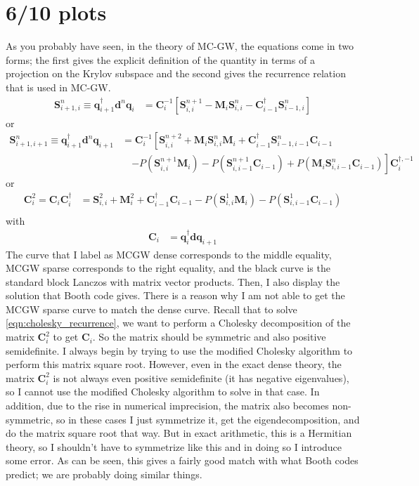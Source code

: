 \section{6/10 plots}
As you probably have seen, in the theory of MC-GW, the equations come in two forms; the first gives the explicit definition of the quantity in terms of a projection on the Krylov subspace and the second gives the recurrence relation that is used in MC-GW.
\begin{align}
    \bm{S}_{i+1,i}^{n}\equiv\bm{q}_{i+1}^{\dag}\bm{d}^n\bm{q}_{i}
    &= {\bm{C}_i^{-1}\left[\bm{S}_{i,i}^{n+1} - \bm{M}_i\bm{S}_{i,i}^n - \bm{C}_{i-1}^{\dag}\bm{S}_{i-1,i}^n\right]}
\end{align}
or
\begin{align}
    \bm{S}_{i+1,i+1}^{n}\equiv\bm{q}_{i+1}^{\dag}\bm{d}^n\bm{q}_{i+1} &= \bm{C}_i^{-1}\left[\bm{S}_{i,i}^{n+2} + \bm{M}_i\bm{S}_{i,i}^{n}\bm{M}_i + \bm{C}_{i-1}^{\dag}\bm{S}_{i-1,i-1}^{n}\bm{C}_{i-1} \right. \nonumber \\
    &\quad \left. - P(\bm{S}_{i,i}^{n+1}\bm{M}_i) - P(\bm{S}_{i,i-1}^{n+1}\bm{C}_{i-1}) + P(\bm{M}_i\bm{S}_{i,i-1}^{n}\bm{C}_{i-1}) \right] \bm{C}_i^{\dag, -1}
\end{align}
or
\begin{align}
    \bm{C}_i^2=\bm{C}_i\bm{C}_i^{\dag} &= {\bm{S}_{i,i}^2+\bm{M}_i^2+\bm{C}_{i-1}^{\dag}\bm{C}_{i-1}-P\left(\bm{S}_{i,i}^{1}\bm{M}_i\right) - P\left(\bm{S}_{i,i-1}^{1}\bm{C}_{i-1}\right)}\\
    \label{eqn:cholesky_recurrence}
\end{align}
with
\begin{align}
    \bm{C}_i &= \bm{q}_i^{\dag}\bm{d}\bm{q}_{i+1}
\end{align}
The curve that I label as MCGW dense corresponds to the middle equality, MCGW sparse corresponds to the right equality, and the black curve is the standard block Lanczos with matrix vector products. Then, I also display the solution that Booth code gives. There is a reason why I am not able to get the MCGW sparse curve to match the dense curve. Recall that to solve \ref{eqn:cholesky_recurrence}, we want to perform a Cholesky decomposition of the matrix $\bm{C}_i^2$ to get $\bm{C}_i$. So the matrix should be symmetric and also positive semidefinite. I always begin by trying to use the modified Cholesky algorithm to perform this matrix square root. However, even in the exact dense theory, the matrix $\bm{C}_i^2$ is not always even positive semidefinite (it has negative eigenvalues), so I cannot use the modified Cholesky algorithm to solve in that case. In addition, due to the rise in numerical imprecision, the matrix also becomes non-symmetric, so in these cases I just symmetrize it, get the eigendecomposition, and do the matrix square root that way. But in exact arithmetic, this is a Hermitian theory, so I shouldn't have to symmetrize like this and in doing so I introduce some error. As can be seen, this gives a fairly good match with what Booth codes predict; we are probably doing similar things. 
